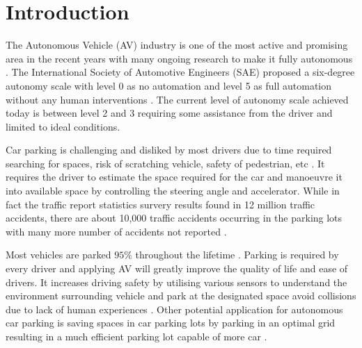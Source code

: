 \documentclass{svproc}
\begin{document}
\section{Introduction}
\label{sec:introduction}
%
%
The Autonomous Vehicle (AV) industry is one of the most active and promising area in the recent years with many ongoing research to make it fully autonomous \cite{talavera2021autonomous}. The International Society of Automotive Engineers (SAE) proposed a six-degree autonomy scale with level 0 as no automation and level 5 as full automation without any human interventions \cite{stoma2021future}. The current level of autonomy scale achieved today is between level 2 and 3 requiring some assistance from the driver and limited to ideal conditions.

Car parking is challenging and disliked by most drivers due to time required searching for spaces, risk of scratching vehicle, safety of pedestrian, etc \cite{baburaj2021smart}\cite{bosch_global_2022}. It requires the driver to estimate the space required for the car and manoeuvre it into available space by controlling the steering angle and accelerator. While in fact the traffic report statistics survery results found in 12 million traffic accidents, there are about 10,000 traffic accidents occurring in the parking lots with many more number of accidents not reported \cite{wang2014automatic}.

Most vehicles are parked $95\%$ throughout the lifetime \cite{choi2019self}. Parking is required by every driver and applying AV will greatly improve the quality of life and ease of drivers. It increases driving safety by utilising various sensors to understand the environment surrounding vehicle and park at the designated space avoid collisions due to lack of human experiences \cite{wang2014automatic}. Other potential application for autonomous car parking is saving spaces in car parking lots by parking in an optimal grid resulting in a much efficient parking lot capable of more car \cite{choi2019self}.
\end{document}
